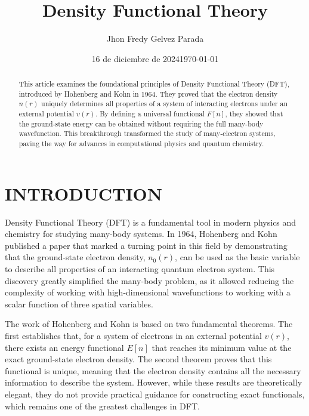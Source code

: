\documentclass[%
 preprint, linenumbers,
 amsmath,amssymb,
 aps, physrev,
]{revtex4-2}
\begin{document}

\title{\textbf{Density Functional Theory}}


\author{Jhon Fredy Gelvez Parada}
\date{16 de diciembre de 2024}

\date{\today}%

\begin{abstract}
\noindent This article examines the foundational principles of Density Functional Theory (DFT), introduced by Hohenberg and Kohn in 1964. They proved that the electron density \(n(r)\) uniquely determines all properties of a system of interacting electrons under an external potential \(v(r)\). By defining a universal functional \(F[n]\), they showed that the ground-state energy can be obtained without requiring the full many-body wavefunction. This breakthrough transformed the study of many-electron systems, paving the way for advances in computational physics and quantum chemistry.
\end{abstract}



\maketitle
\section{\label{sec:level1}INTRODUCTION }
Density Functional Theory (DFT) is a fundamental tool in modern physics and chemistry for studying many-body systems. In 1964, Hohenberg and Kohn published a paper that marked a turning point in this field by demonstrating that the ground-state electron density, \( n_0(r) \), can be used as the basic variable to describe all properties of an interacting quantum electron system. This discovery greatly simplified the many-body problem, as it allowed reducing the complexity of working with high-dimensional wavefunctions to working with a scalar function of three spatial variables.

The work of Hohenberg and Kohn is based on two fundamental theorems. The first establishes that, for a system of electrons in an external potential \( v(r) \), there exists an energy functional \( E[n] \) that reaches its minimum value at the exact ground-state electron density. The second theorem proves that this functional is unique, meaning that the electron density contains all the necessary information to describe the system. However, while these results are theoretically elegant, they do not provide practical guidance for constructing exact functionals, which remains one of the greatest challenges in DFT.
\end{document}
